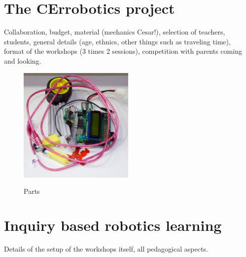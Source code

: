 \documentclass[a4paper]{llncs}
\begin{document}
\section{The CErrobotics project}
Collaboration, budget, material (mechanics Cesar!), selection of teachers, students, general details (age, ethnics, other things such as traveling time), format of the workshops (3 times 2 sessions), competition with parents coming and looking.
\begin{figure}[htp]
\begin{center}
\includegraphics[width=0.5\textwidth]{img/robot_parts.jpg}\label{fig:parts}
\caption[]{Parts}
\end{center}
\end{figure}

\section{Inquiry based robotics learning}
Details of the setup of the workshops itself, all pedagogical aspects.
\end{document}
